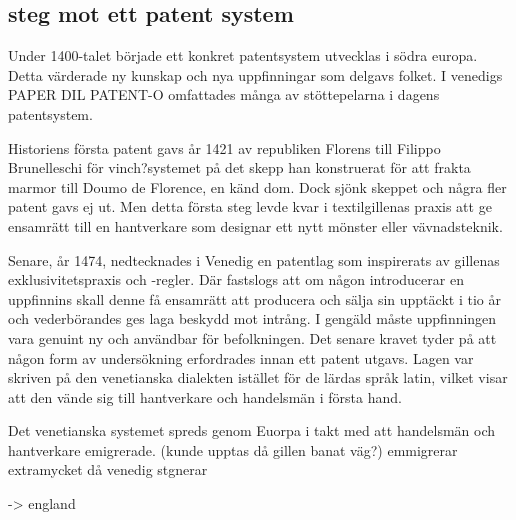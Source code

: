 
\subsection{steg mot ett patent system} %
\label{sub:steg_mot_ett_patent_system}
Under 1400-talet började ett konkret patentsystem utvecklas i södra europa. 
Detta värderade ny kunskap och nya uppfinningar som delgavs folket. 
I venedigs PAPER DIL PATENT-O omfattades många av stöttepelarna i dagens patentsystem. 


Historiens första patent gavs år 1421 av republiken Florens till Filippo Brunelleschi för vinch?systemet på det skepp han konstruerat för att frakta marmor till Doumo de Florence, en känd dom. 
Dock sjönk skeppet och några fler patent gavs ej ut. 
Men detta första steg levde kvar i textilgillenas praxis att ge ensamrätt till en hantverkare som designar ett nytt mönster eller vävnadsteknik. 


Senare, år 1474, nedtecknades i Venedig en patentlag som inspirerats av gillenas exklusivitetspraxis och -regler. 
Där fastslogs att om någon introducerar en uppfinnins skall denne få ensamrätt att producera och sälja sin upptäckt i tio år och vederbörandes ges laga beskydd mot intrång. 
I gengäld måste uppfinningen vara genuint ny och användbar för befolkningen. 
Det senare kravet tyder på att någon form av undersökning erfordrades innan ett patent utgavs. 
Lagen var skriven på den venetianska dialekten istället för de lärdas språk latin, vilket visar att den vände sig till hantverkare och handelsmän i första hand.


Det venetianska systemet spreds genom Euorpa i takt med att handelsmän och hantverkare emigrerade. 
(kunde upptas då gillen banat väg?) emmigrerar extramycket då venedig stgnerar

-> england




